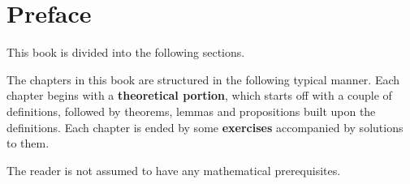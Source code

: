 \section*{Preface}
This book is divided into the following sections.







The chapters in this book are structured in the following typical manner. Each chapter begins with a \textbf{theoretical portion}, which starts off with a couple of definitions, followed by theorems, lemmas and propositions built upon the definitions. Each chapter is ended by some \textbf{exercises} accompanied by solutions to them.

The reader is not assumed to have any mathematical prerequisites.
